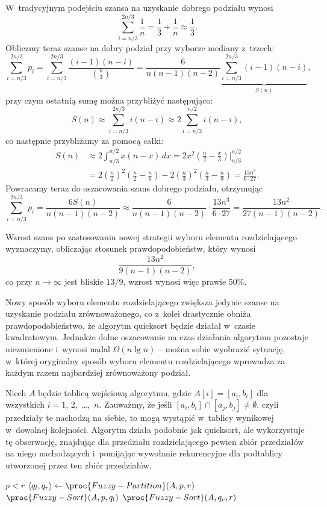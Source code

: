 \subproblem %
W~tradycyjnym podejściu szansa na uzyskanie dobrego podziału wynosi
\[
	\sum_{i=n/3}^{2n/3}\frac{1}{n} = \frac{1}{3}+\frac{1}{n} \approx \frac{1}{3}.
\]
Obliczmy teraz szanse na dobry podział przy wyborze mediany z~trzech:
\[
	\sum_{i=n/3}^{2n/3}p_i = \sum_{i=n/3}^{2n/3}\frac{(i-1)(n-i)}{\binom{n}{3}} = \frac{6}{n(n-1)(n-2)}\underbrace{\sum_{i=n/3}^{2n/3}(i-1)(n-i)}_{S(n)},
\]
przy czym ostatnią sumę można przybliżyć następująco:
\[
	S(n) \approx \sum_{i=n/3}^{2n/3}i(n-i) \approx 2\sum_{i=n/3}^{n/2}i(n-i),
\]
co następnie przybliżamy za pomocą całki:
\begin{align*}
	S(n) &\approx 2\int_{n/3}^{n/2}x(n-x)\,dx = 2x^2\left(\frac{n}{2}-\frac{x}{3}\right)\Big|_{n/3}^{n/2} \\
	&= 2\left(\frac{n}{2}\right)^2\left(\frac{n}{2}-\frac{n}{6}\right)-2\left(\frac{n}{3}\right)^2\left(\frac{n}{3}-\frac{n}{9}\right) = \frac{13n^3}{6\cdot27}.
\end{align*}
Powracamy teraz do oszacowania szans dobrego podziału, otrzymując
\[
	\sum_{i=n/3}^{2n/3}p_i = \frac{6S(n)}{n(n-1)(n-2)} \approx \frac{6}{n(n-1)(n-2)}\cdot\frac{13n^3}{6\cdot27} = \frac{13n^2}{27(n-1)(n-2)}.
\]

Wzrost szans po zastosowaniu nowej strategii wyboru elementu rozdzielającego wyznaczymy, obliczając stosunek prawdopodobieństw, który wynosi
\[
	\frac{13n^2}{9(n-1)(n-2)},
\]
co przy $n\to\infty$ jest bliskie $13/9$, wzrost wynosi więc prawie 50\%.

\subproblem %
Nowy sposób wyboru elementu rozdzielającego zwiększa jedynie szanse na uzyskanie podziału zrównoważonego, co z~kolei drastycznie obniża prawdopodobieństwo, że algorytm quicksort będzie działał w~czasie kwadratowym. Jednakże dolne oszacowanie na czas działania algorytmu pozostaje niezmienione i~wynosi nadal $\Omega(n\lg n)$ -- można sobie wyobrazić sytuację, w~której oryginalny sposób wyboru elementu rozdzielającego wprowadza za każdym razem najbardziej zrównoważony podział.


\subproblem %
Niech $A$ będzie tablicą wejściową algorytmu, gdzie $A[i]=[a_i,b_i]$ dla wszystkich $i=1$, 2,~\dots,~$n$. Zauważmy, że jeśli $[a_i,b_i]\cap[a_j,b_j]\ne\emptyset$, czyli przedziały te nachodzą na siebie, to mogą wystąpić w~tablicy wynikowej w~dowolnej kolejności. Algorytm działa podobnie jak quicksort, ale wykorzystuje tę obserwację, znajdując dla przedziału rozdzielającego pewien zbiór przedziałów na niego nachodzących i~pomijając wywołanie rekurencyjne dla podtablicy utworzonej przez ten zbiór przedziałów.
\begin{codebox}
\li	\If $p<r$
\li		\Then
			$\langle q_l,q_r\rangle\gets\proc{Fuzzy-Partition}(A,p,r)$
\li			$\proc{Fuzzy-Sort}(A,p,q_l)$
\li			$\proc{Fuzzy-Sort}(A,q_r,r)$
		\End
\end{codebox}

